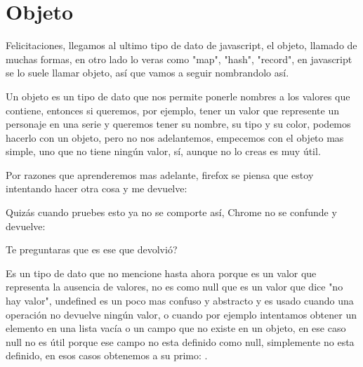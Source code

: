 \documentclass[letterpaper,10pt,spanish]{sphinxmanual}
\begin{document}
\section{Objeto}
\label{\detokenize{datos-con-javascript:objeto}}
Felicitaciones, llegamos al ultimo tipo de dato de javascript, el objeto,
llamado de muchas formas, en otro lado lo veras como "map", "hash", "record",
en javascript se lo suele llamar objeto, así que vamos a seguir nombrandolo
así.

Un objeto es un tipo de dato que nos permite ponerle nombres a los valores que
contiene, entonces si queremos, por ejemplo, tener un valor que represente un
personaje en una serie y queremos tener su nombre, su tipo y su color, podemos
hacerlo con un objeto, pero no nos adelantemos, empecemos con el objeto mas
simple, uno que no tiene ningún valor, sí, aunque no lo creas es muy útil.

%
\begin{sphinxVerbatim}[commandchars=\\\{\}]
\end{sphinxVerbatim}

Por razones que aprenderemos mas adelante, firefox se piensa que estoy
intentando hacer otra cosa y me devuelve:

%
\begin{sphinxVerbatim}[commandchars=\\\{\}]
 
\end{sphinxVerbatim}

Quizás cuando pruebes esto ya no se comporte así, Chrome no se confunde y devuelve:

%
\begin{sphinxVerbatim}[commandchars=\\\{\}]
 
\end{sphinxVerbatim}

Te preguntaras que es ese  que devolvió?

Es un tipo de dato que no mencione hasta ahora porque es un valor que
representa la ausencia de valores, no es como null que es un valor que dice "no
hay valor", undefined es un poco mas confuso y abstracto y es usado cuando una
operación no devuelve ningún valor, o cuando por ejemplo intentamos obtener un
elemento en una lista vacía o un campo que no existe en un objeto, en ese caso
null no es útil porque ese campo no esta definido como null, simplemente no
esta definido, en esos casos obtenemos a su primo: .
\end{document}
